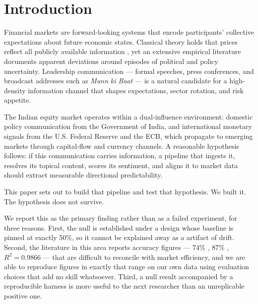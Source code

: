 \documentclass[11pt]{article}
\begin{document}
\begin{abstract}
\vspace{5mm}
\noindent\textbf{Keywords:} Indian stock market, political communication, null result, NLP, FinBERT, topic modeling, NMF, Granger causality, false discovery rate, backtest overfitting, walk-forward validation, market efficiency, SENSEX, Nifty 50, Federal Reserve, ECB.
\end{abstract}

\section{Introduction}
Financial markets are forward-looking systems that encode participants' collective expectations about future economic states. Classical theory holds that prices reflect all publicly available information \cite{fama1970}, yet an extensive empirical literature documents apparent deviations around episodes of political and policy uncertainty. Leadership communication --- formal speeches, press conferences, and broadcast addresses such as \textit{Mann ki Baat} --- is a natural candidate for a high-density information channel that shapes expectations, sector rotation, and risk appetite.

The Indian equity market operates within a dual-influence environment: domestic policy communication from the Government of India, and international monetary signals from the U.S. Federal Reserve and the ECB, which propagate to emerging markets through capital-flow and currency channels. A reasonable hypothesis follows: if this communication carries information, a pipeline that ingests it, resolves its topical content, scores its sentiment, and aligns it to market data should extract measurable directional predictability.

This paper sets out to build that pipeline and test that hypothesis. We built it. The hypothesis does not survive.

We report this as the primary finding rather than as a failed experiment, for three reasons. First, the null is established under a design whose baseline is pinned at exactly 50\%, so it cannot be explained away as a artifact of drift. Second, the literature in this area reports accuracy figures --- 74\% \cite{jain2023}, 87\% \cite{biswal2022}, $R^2 = 0.9866$ \cite{bhandari2025} --- that are difficult to reconcile with market efficiency, and we are able to reproduce figures in exactly that range on our own data using evaluation choices that add no skill whatsoever. Third, a null result accompanied by a reproducible harness is more useful to the next researcher than an unreplicable positive one.
\end{document}
